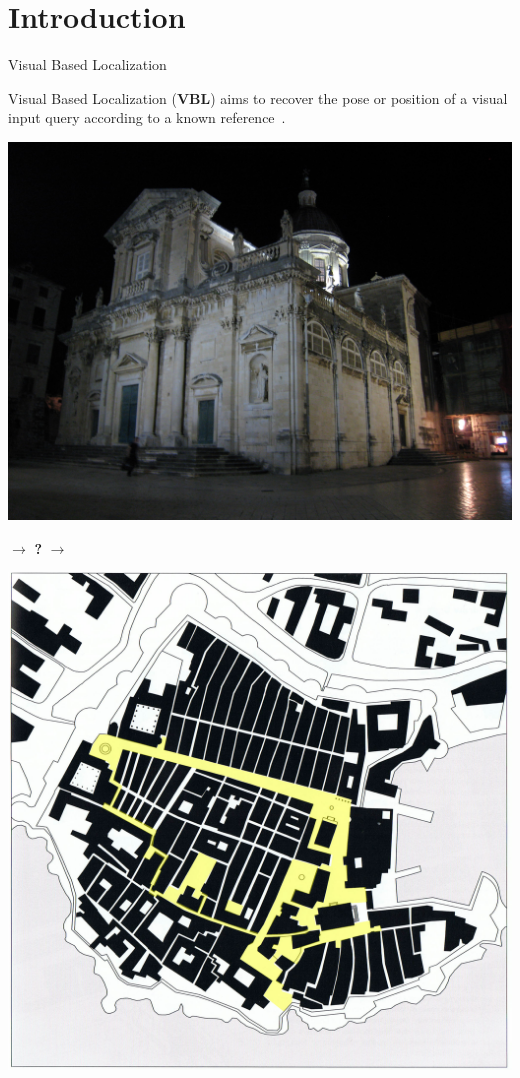 \section{Introduction}

\label{sec:intro}

\begin{frame}{Visual Based Localization}
	
	Visual Based Localization (\textbf{VBL}) aims to recover the pose or position of a visual input query according to a known reference~\cite{Piasco2017}.
	\vfill	
	\begin{minipage}{0.4\linewidth}
	   \centering
		\includegraphics[width=\linewidth]{images/intro_fig/dubrovnik_night_query.jpg}
	\end{minipage}
	$\rightarrow$ \textbf{?} $\rightarrow$
	\begin{minipage}{0.4\linewidth}
	   \centering
		\includegraphics[width=\linewidth]{images/intro_fig/dubrovnik_map.jpg}
	\end{minipage}	
\end{frame}

